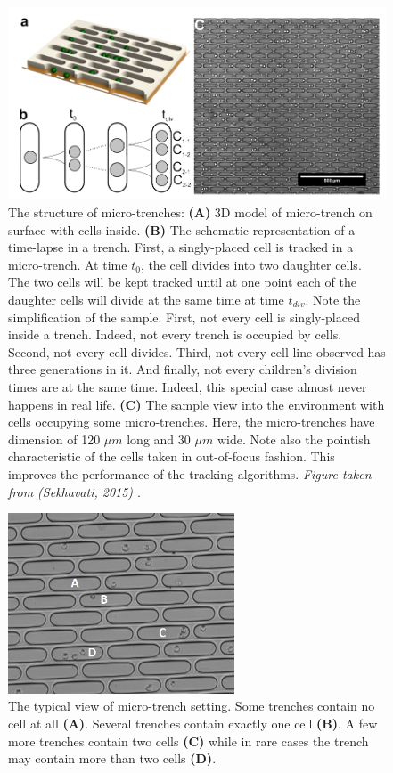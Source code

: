 \documentclass[pdftex,12pt,a4paper]{report}
\begin{document}
\begin{figure}[H]
\centering
\includegraphics[width=1\textwidth]{images/trenches-sekhavati}
\caption[The structure of micro-trenches]{The structure of micro-trenches: \textbf{(A)} 3D model of micro-trench on surface with cells inside. \textbf{(B)} The schematic representation of a time-lapse in a trench. First, a singly-placed cell is tracked in a micro-trench. At time $t_0$, the cell divides into two daughter cells. The two cells will be kept tracked until at one point each of the daughter cells will divide at the same time at time $t_{div}$. Note the simplification of the sample. First, not every cell is singly-placed inside a trench. Indeed, not every trench is occupied by cells. Second, not every cell divides. Third, not every cell line observed has three generations in it. And finally, not every children's division times are at the same time. Indeed, this special case almost never happens in real life. \textbf{(C)} The sample view into the environment with cells occupying some micro-trenches. Here, the micro-trenches have dimension of 120 $\mu m$ long and 30 $\mu m$ wide. Note also the pointish characteristic of the cells taken in out-of-focus fashion. This improves the performance of the tracking algorithms. \textit{Figure taken from (Sekhavati, 2015) \cite{sekhavati2015dynamic}}.}
\label{fig:microtrench_design}
\end{figure}

\begin{figure}[H]
\centering
\includegraphics[width=0.6\textwidth]{images/microtrench_in}
\caption[The typical view of micro-trench setting]{The typical view of micro-trench setting. Some trenches contain no cell at all \textbf{(A)}. Several trenches contain exactly one cell \textbf{(B)}. A few more trenches contain two cells \textbf{(C)} while in rare cases the trench may contain more than two cells \textbf{(D)}.}
\label{fig:microtrench_sample}
\end{figure}
\end{document}
